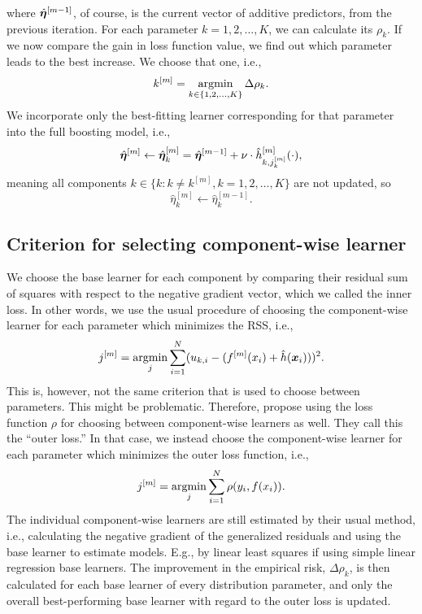 where $\hat{\boldsymbol{\eta}}^{[m-1]}$, of course, is the current vector of additive predictors, from the previous iteration.
For each parameter $k=1,2,\ldots,K$, we can calculate its $\rho_{k}$. If we now compare the gain in loss function value,
we find out which parameter leads to the best increase. We choose that one, i.e.,
\begin{equation}
    k^{[m]}=\operatorname*{argmin}_{k\in\{1,2,\ldots,K\}}\Delta\rho_{k}.
\end{equation}
We incorporate only the best-fitting learner corresponding for that parameter into the full boosting model, i.e.,
\begin{equation}
    \hat{\boldsymbol{\eta}}^{[m]}\gets \hat{\boldsymbol{\eta}}^{[m]}_{k}=\hat{\boldsymbol{\eta}}^{[m-1]}+\nu\cdot\hat{h}^{[m]}_{k,j_k^{[m]}}(\cdot),
\end{equation}
meaning all components $k\in\{k\colon k\neq k^{[m]}, k=1,2,\ldots,K\}$ are not updated, so
\begin{equation}
    \hat{\eta}_{k}^{[m]}\gets\hat{\eta}_{k}^{[m-1]}.
\end{equation}

\subsection{Criterion for selecting component-wise learner}
We choose the base learner for each component by comparing their residual sum of squares with respect to the negative gradient vector, which we called the inner loss. In other words, we use the usual procedure of choosing the component-wise learner for each parameter which minimizes the RSS, i.e.,
\begin{equation}
    j^{[m]}=\operatorname*{argmin}_{j} \sum_{i=1}^N (u_{k,i}-(f^{[m]}(x_i)+\hat{h}(\bm{x}_i)))^2.
\end{equation}
This is, however, not the same criterion that is used to choose between parameters. This might be problematic. Therefore, \citet{thomas2018} propose using the loss function $\rho$ for choosing between component-wise learners as well. They call this the ``outer loss.'' In that case, we instead choose the component-wise learner for each parameter which minimizes the outer loss function, i.e., 
\begin{equation}
    j^{[m]}=\operatorname*{argmin}_{j} \sum_{i=1}^N \rho(y_i,f(x_i)).
\end{equation}
The individual component-wise learners are still estimated by their usual method, i.e., calculating the negative gradient of the generalized residuals and using the base learner to estimate models. E.g., by linear least squares if using simple linear regression base learners. The improvement in the empirical risk, $\Delta\rho_{k}$, is then calculated for each base learner of every distribution parameter, and only the overall best-performing base learner with regard to the outer loss is updated.


